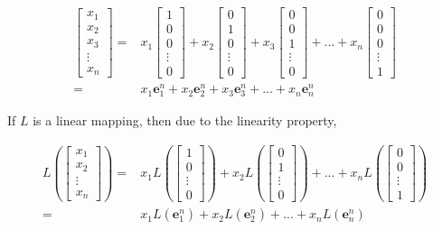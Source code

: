 \documentclass{article}
\begin{document}
\begin{align*}
\begin{bmatrix} x_1 \\ x_2 \\ x_3 \\ \vdots \\ x_n \end{bmatrix} = & x_1\begin{bmatrix} 1 \\ 0 \\ 0 \\ \vdots \\ 0 \end{bmatrix} + x_2\begin{bmatrix} 0 \\ 1 \\ 0 \\ \vdots \\ 0 \end{bmatrix} + x_3\begin{bmatrix} 0 \\ 0 \\ 1 \\ \vdots \\ 0 \end{bmatrix} + ... + x_n\begin{bmatrix} 0 \\ 0 \\ 0 \\ \vdots \\ 1 \end{bmatrix} \\
= & x_1 \mathbf{e}^n_1 + x_2 \mathbf{e}^n_2 + x_3\mathbf{e}^n_3 + ... + x_n \mathbf{e}^n_n
\end{align*}

If \(L\) is a linear mapping, then due to the linearity property, 

\begin{align*}
L\left(\begin{bmatrix} x_1 \\ x_2 \\ \vdots \\ x_n \end{bmatrix}\right) = & x_1 L\left(\begin{bmatrix} 1 \\ 0 \\ \vdots \\ 0 \end{bmatrix}\right) + x_2 L\left(\begin{bmatrix} 0 \\ 1 \\ \vdots \\ 0 \end{bmatrix}\right) + ... + x_n L\left(\begin{bmatrix} 0 \\ 0 \\ \vdots \\ 1 \end{bmatrix}\right) \\ 
= & x_1 L(\mathbf{e}^n_1) + x_2 L(\mathbf{e}^n_2) + ... + x_n L(\mathbf{e}^n_n)
\end{align*}
\end{document}

